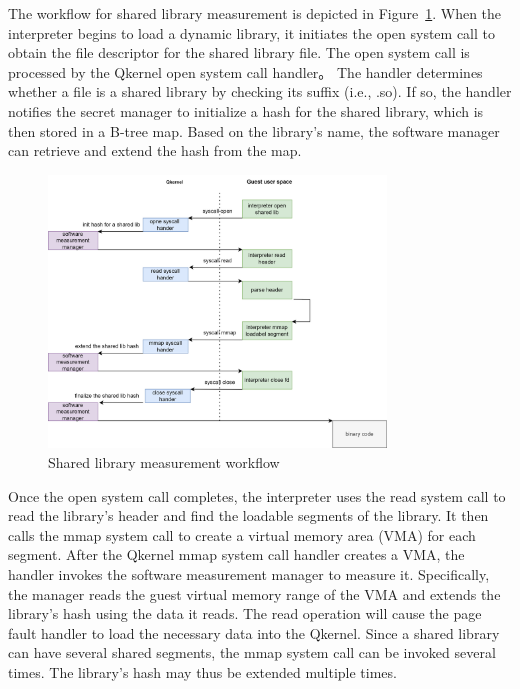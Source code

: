 The workflow for shared library measurement is depicted in Figure~\ref{fig:measure_load_shared_libarart}. When the interpreter begins to load a dynamic library, it initiates the open system call to obtain the file descriptor for the shared library file. The open system call is processed by the Qkernel open system call handler。 
The handler determines whether a file is a shared library by checking its suffix (i.e., .so). If so, the handler notifies the secret manager to initialize a hash for the shared library, which is then stored in a B-tree map. Based on the library's name, the software manager can retrieve and extend the 
hash from the map.

\begin{figure}[!htb]
    \centering
    \includegraphics[width=0.8\textwidth]{images/measure_load_shared_libarart.png}
    \caption[Shared library measurement workflow]{Shared library measurement workflow}
    \label{fig:measure_load_shared_libarart}
\end{figure}


Once the open system call completes, the interpreter uses the read system call to read the library's header and find the loadable segments of the library. It then calls the mmap system call to create a virtual memory area (VMA) for each segment. After the Qkernel mmap system call handler creates a 
VMA,  the handler invokes the software measurement manager to measure it. Specifically, the manager reads the guest virtual memory range of the VMA and extends the library's hash using the data it reads. The read operation will cause the page fault handler to load the necessary data into the Qkernel. 
Since a shared library can have several shared segments, the mmap system call can be invoked several times. The library's hash may thus be extended multiple times.

